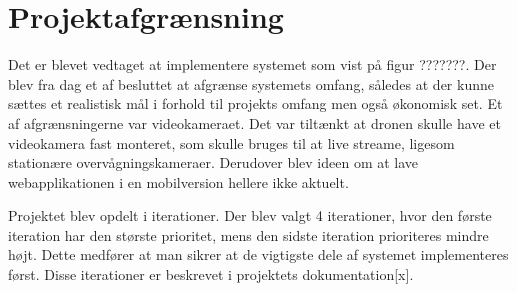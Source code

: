 \section{Projektafgrænsning}

Det er blevet vedtaget at implementere systemet som vist på figur ???????.
Der blev fra dag et af besluttet at afgrænse systemets omfang, således at der kunne sættes et realistisk mål i forhold til projekts omfang men også økonomisk set.
Et af afgrænsningerne var videokameraet. Det var tiltænkt at dronen skulle have et videokamera fast monteret, som skulle bruges til at live streame, ligesom stationære overvågningskameraer. 
Derudover blev ideen om at lave webapplikationen i en mobilversion hellere ikke aktuelt. 

Projektet blev opdelt i iterationer. Der blev valgt 4 iterationer, hvor den første iteration har den største prioritet, mens den sidste iteration prioriteres mindre højt. Dette medfører at man sikrer at de vigtigste dele af systemet implementeres først. Disse iterationer er beskrevet i projektets dokumentation[x].

